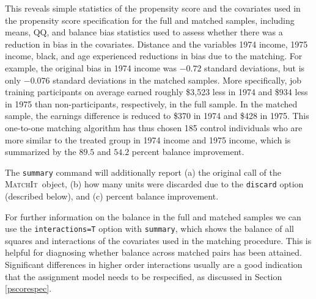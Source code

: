 \documentclass[oneside,letterpaper,titlepage]{article}
\newcommand{\MatchIt}{\textsc{MatchIt}}
\begin{document}
This reveals simple statistics of the propensity score and the
covariates used in the propensity score specification for the full and
matched samples, including means, QQ, and balance bias statistics used
to assess whether there was a reduction in bias in the covariates.
Distance and the variables 1974 income, 1975 income, black, and age
experienced reductions in bias due to the matching.  For example, the
original bias in 1974 income was $-0.72$ standard deviations, but is
only $-0.076$ standard deviations in the matched samples.  More
specifically, job training participants on average earned roughly
\$3,523 less in 1974 and \$934 less in 1975 than non-participants,
respectively, in the full sample.  In the matched sample, the earnings
difference is reduced to \$370 in 1974 and \$428 in 1975.  This
one-to-one matching algorithm has thus chosen 185 control individuals
who are more similar to the treated group in 1974 income and 1975
income, which is summarized by the $89.5$ and $54.2$ percent
balance improvement. 

The \texttt{summary} command will additionally report (a) the original
call of the \MatchIt\ object, (b) how many units were discarded due
to the \texttt{discard} option (described below), and (c) percent
balance improvement.  

For further information on the balance in the full and matched samples
we can use the {\tt interactions=T} option with {\tt summary}, which
shows the balance of all squares and interactions of the covariates
used in the matching procedure.  This is helpful for diagnosing
whether balance across matched pairs has been attained.  Significant
differences in higher order interactions usually are a good indication
that the assignment model needs to be respecified, as discussed in
Section \ref{pscorespec}.
\end{document}
